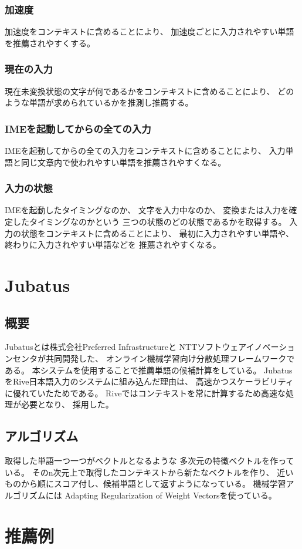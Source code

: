 \subsubsection{加速度}
加速度をコンテキストに含めることにより、
加速度ごとに入力されやすい単語を推薦されやすくする。

\subsubsection{現在の入力}
現在未変換状態の文字が何であるかをコンテキストに含めることにより、
どのような単語が求められているかを推測し推薦する。

\subsubsection{IMEを起動してからの全ての入力}
IMEを起動してからの全ての入力をコンテキストに含めることにより、
入力単語と同じ文章内で使われやすい単語を推薦されやすくなる。

\subsubsection{入力の状態}
IMEを起動したタイミングなのか、
文字を入力中なのか、
変換または入力を確定したタイミングなのかという
三つの状態のどの状態であるかを取得する。
入力の状態をコンテキストに含めることにより、
最初に入力されやすい単語や、終わりに入力されやすい単語などを
推薦されやすくなる。

\section{Jubatus}
\label{sec:jubatus}

\subsection{概要}
Jubatus\cite{jubatus}とは株式会社Preferred Infrastructureと
NTTソフトウェアイノベーションセンタが共同開発した、
オンライン機械学習向け分散処理フレームワークである。
本システムを使用することで推薦単語の候補計算をしている。
JubatusをRive日本語入力のシステムに組み込んだ理由は、
高速かつスケーラビリティに優れていたためである。
Riveではコンテキストを常に計算するため高速な処理が必要となり、
採用した。

\subsection{アルゴリズム}
取得した単語一つ一つがベクトルとなるような
多次元の特徴ベクトルを作っている。
そのn次元上で取得したコンテキストから新たなベクトルを作り、
近いものから順にスコア付し、候補単語として返すようになっている。
機械学習アルゴリズムには
Adapting Regularization of Weight Vectors\cite{AROW}を使っている。

\section{推薦例}


